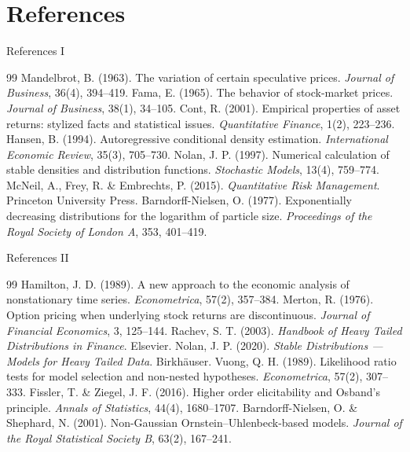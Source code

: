 \documentclass[9pt, aspectratio=169, t]{beamer}
\theoremstyle{definition}
\begin{document}
\section*{References}

\begin{frame}{References I}
\small
\begin{thebibliography}{99}
 Mandelbrot, B. (1963). The variation of certain speculative prices. \textit{Journal of Business}, 36(4), 394--419.
 Fama, E. (1965). The behavior of stock-market prices. \textit{Journal of Business}, 38(1), 34--105.
 Cont, R. (2001). Empirical properties of asset returns: stylized facts and statistical issues. \textit{Quantitative Finance}, 1(2), 223--236.
 Hansen, B. (1994). Autoregressive conditional density estimation. \textit{International Economic Review}, 35(3), 705--730.
 Nolan, J. P. (1997). Numerical calculation of stable densities and distribution functions. \textit{Stochastic Models}, 13(4), 759--774.
 McNeil, A., Frey, R. \& Embrechts, P. (2015). \textit{Quantitative Risk Management}. Princeton University Press.
 Barndorff-Nielsen, O. (1977). Exponentially decreasing distributions for the logarithm of particle size. \textit{Proceedings of the Royal Society of London A}, 353, 401--419.
\end{thebibliography}
\end{frame}

\begin{frame}{References II}
\small
\begin{thebibliography}{99}
 Hamilton, J. D. (1989). A new approach to the economic analysis of nonstationary time series. \textit{Econometrica}, 57(2), 357--384.
 Merton, R. (1976). Option pricing when underlying stock returns are discontinuous. \textit{Journal of Financial Economics}, 3, 125--144.
 Rachev, S. T. (2003). \textit{Handbook of Heavy Tailed Distributions in Finance}. Elsevier.
 Nolan, J. P. (2020). \textit{Stable Distributions --- Models for Heavy Tailed Data}. Birkh\"{a}user.
 Vuong, Q. H. (1989). Likelihood ratio tests for model selection and non-nested hypotheses. \textit{Econometrica}, 57(2), 307--333.
 Fissler, T. \& Ziegel, J. F. (2016). Higher order elicitability and Osband's principle. \textit{Annals of Statistics}, 44(4), 1680--1707.
 Barndorff-Nielsen, O. \& Shephard, N. (2001). Non-Gaussian Ornstein--Uhlenbeck-based models. \textit{Journal of the Royal Statistical Society B}, 63(2), 167--241.
\end{thebibliography}
\end{frame}
\end{document}
